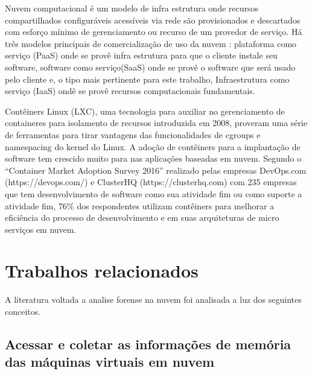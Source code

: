 \documentclass[conference]{IEEEtran}
\begin{document}
Nuvem computacional é um modelo de infra estrutura onde recursos compartilhados configuráveis acessíveis via rede são provisionados e descartados com esforço mínimo de gerenciamento ou recurso de um provedor de serviço. \cite{NIST2011}
%
Há três modelos principais de comercialização de uso da nuvem \cite{NIST2011}: plataforma como serviço (PaaS) onde se provê infra estrutura para que o cliente instale seu software, software como serviço(SaaS) onde se provê o software que será usado pelo cliente e, o tipo mais pertinente para este trabalho, Infraestrutura como serviço (IaaS) ondê se provê recursos computacionais fundamentais.


Contêiners Linux (LXC), uma tecnologia para auxiliar no gerenciamento de containeres para isolamento de recursos introduzida em 2008, proveram uma série de ferramentas para tirar vantagens das funcionalidades de cgroups e namespacing do kernel do Linux. 
%
A adoção de contêiners para a implantação de software tem crescido muito para nas aplicações baseadas em nuvem. Segundo o ``Container Market Adoption Survey 2016'' realizado pelas empresas DevOps.com (https://devops.com/) e ClusterHQ (https://clusterhq.com) com 235 empresas que tem desenvolvimento de software como sua atividade fim ou como suporte a atividade fim, 76\% dos respondentes utilizam contêiners para melhorar a eficiência do processo de desenvolvimento e em suas arquiteturas de micro serviços em nuvem.

\section{Trabalhos relacionados}
\label{sec:related}

A literatura voltada a analise forense na nuvem foi analisada a luz dos seguintes conceitos. 

\subsection{Acessar e coletar as informações de memória das máquinas virtuais em nuvem}
\end{document}
